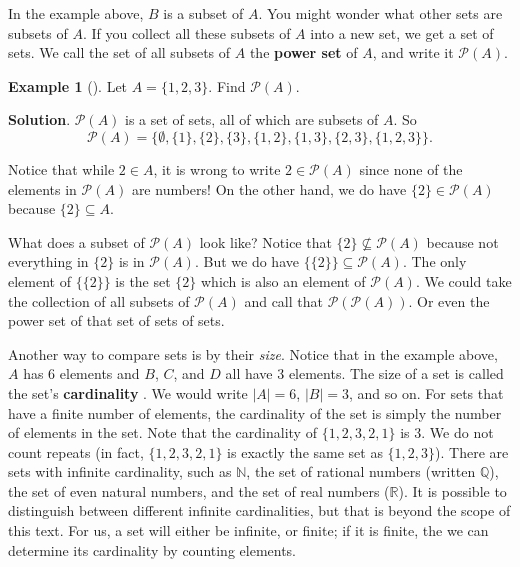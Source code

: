 \documentclass[10pt,]{book}
\newcommand{\terminology}[1]{\textbf{#1}}
\theoremstyle{plain}
\theoremstyle{definition}
\theoremstyle{definition}
\newtheorem{example}[theorem]{Example}
\theoremstyle{definition}
\theoremstyle{definition}
\numberwithin{equation}{chapter}
\def\N{\mathbb N}
\def\pow{\mathcal P}
\begin{document}
\hypertarget{p-1495}{}%
In the example above, \(B\) is a subset of \(A\). You might wonder what other sets are subsets of \(A\). If you collect all these subsets of \(A\) into a new set, we get a set of sets. We call the set of all subsets of \(A\) the \terminology{power set}  of \(A\), and write it \(\pow(A)\).%
\begin{example}[]\label{example-41}
\hypertarget{p-1496}{}%
Let \(A = \{1,2,3\}\). Find \(\pow(A)\).%
\par\smallskip%
\noindent\textbf{Solution}.\hypertarget{solution-130}{}\quad%
\hypertarget{p-1497}{}%
\(\pow(A)\) is a set of sets, all of which are subsets of \(A\). So%
\begin{equation*}
\pow(A) = \{ \emptyset, \{1\}, \{2\}, \{3\}, \{1,2\}, \{1, 3\}, \{2,3\}, \{1,2,3\}\}.
\end{equation*}
%
\par
\hypertarget{p-1498}{}%
Notice that while \(2 \in A\), it is wrong to write \(2 \in \pow(A)\) since none of the elements in \(\pow(A)\) are numbers! On the other hand, we do have \(\{2\} \in \pow(A)\) because \(\{2\} \subseteq A\).%
\par
\hypertarget{p-1499}{}%
What does a subset of \(\pow(A)\) look like? Notice that \(\{2\} \not\subseteq \pow(A)\) because not everything in \(\{2\}\) is in \(\pow(A)\). But we do have \(\{ \{2\} \} \subseteq \pow(A)\). The only element of \(\{\{2\}\}\) is the set \(\{2\}\) which is also an element of \(\pow(A)\). We could take the collection of all subsets of \(\pow(A)\) and call that \(\pow(\pow(A))\). Or even the power set of that set of sets of sets.%
\end{example}
\hypertarget{p-1500}{}%
Another way to compare sets is by their \emph{size}. Notice that in the example above, \(A\) has 6 elements and \(B\), \(C\), and \(D\) all have 3 elements. The size of a set is called the set's \terminology{cardinality} . We would write \(|A| = 6\), \(|B| = 3\), and so on. For sets that have a finite number of elements, the cardinality of the set is simply the number of elements in the set. Note that the cardinality of \(\{ 1, 2, 3, 2, 1\}\) is 3. We do not count repeats (in fact, \(\{1, 2, 3, 2, 1\}\) is exactly the same set as \(\{1, 2, 3\}\)). There are sets with infinite cardinality, such as \(\N\), the set of rational numbers (written \(\mathbb Q\)), the set of even natural numbers, and the set of real numbers (\(\mathbb R\)). It is possible to distinguish between different infinite cardinalities, but that is beyond the scope of this text. For us, a set will either be infinite, or finite; if it is finite, the we can determine its cardinality by counting elements.%
\end{document}
